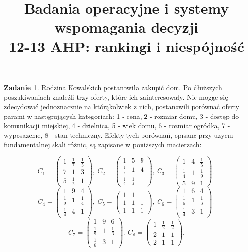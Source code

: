 \documentclass{article}[UTF8]
\theoremstyle{definition}
\newtheorem{zad}{Zadanie}
\begin{document}
\title{Badania operacyjne i systemy wspomagania decyzji
\\ \Large 12-13 AHP: rankingi i niespójność}
\date{}

\maketitle

\begin{zad}

Rodzina Kowalskich postanowiła zakupić dom. Po dłuższych poszukiwaniach znaleźli trzy oferty, które ich zainteresowały. Nie mogąc się zdecydować jednoznacznie na którąkolwiek z nich, postanowili porównać oferty parami w następujących kategoriach:
1 - cena,
2 - rozmiar domu,
3 - dostęp do komunikacji miejskiej,
4 - dzielnica,
5 - wiek domu,
6 - rozmiar ogródka,
7 - wyposażenie,
8 - stan techniczny.
Efekty tych porównań, opisane przy użyciu fundamentalnej skali różnic, są zapisane w poniższych macierzach:


$$C_1=\begin{pmatrix}
1 & \frac{1}{7} & \frac{1}{5} \\
7&1&3 \\
5&\frac{1}{3}&1
\end{pmatrix}, \
C_2=\begin{pmatrix}
1&5&9\\
\frac{1}{5}&1&4\\
\frac{1}{9}&\frac{1}{4}&1
\end{pmatrix}, \
C_3=\begin{pmatrix}
1&4&\frac{1}{5}\\
\frac{1}{4}&1&\frac{1}{9}\\
5&9&1
\end{pmatrix},
$$
$$
C_4=\begin{pmatrix}
1&9&4\\
\frac{1}{9}&1&\frac{1}{4}\\
\frac{1}{4}&4&1
\end{pmatrix}, \
C_5=\begin{pmatrix}
1&1&1\\
1&1&1\\
1&1&1
\end{pmatrix}, \
C_6=\begin{pmatrix}
1&6&4\\
\frac{1}{6}&1&\frac{1}{3}\\
\frac{1}{4}&3&1
\end{pmatrix},
$$
$$C_7=\begin{pmatrix}
1&9&6\\
\frac{1}{9}&1&\frac{1}{3}\\
\frac{1}{6}&3&1
\end{pmatrix}, \
C_8=\begin{pmatrix}
1&\frac{1}{2}&\frac{1}{2}\\
2&1&1\\
2&1&1
\end{pmatrix}.
$$


\end{zad}
\end{document}
